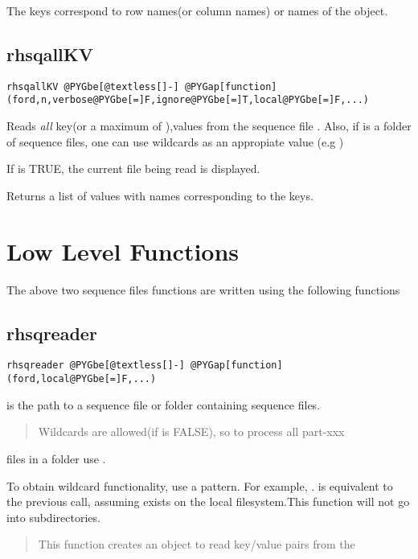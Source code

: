 \documentclass[letterpaper,10pt,english]{manual}
\begin{document}
The keys correspond to row names(or column names) or names of the object.


\subsection{rhsqallKV}

\begin{Verbatim}[commandchars=@\[\]]
rhsqallKV @PYGbe[@textless[]-] @PYGap[function](ford,n,verbose@PYGbe[=]F,ignore@PYGbe[=]T,local@PYGbe[=]F,...)
\end{Verbatim}

Reads \emph{all} key(or a maximum of ),values from the sequence file
. Also, if  is a folder of sequence files, one
can use wildcards as an appropiate value (e.g )

If  is TRUE, the current file being read is displayed.

Returns a list of values with names corresponding to the keys.


\section{Low Level Functions}

The above two sequence files functions are written using the following functions


\subsection{rhsqreader}

\begin{Verbatim}[commandchars=@\[\]]
rhsqreader @PYGbe[@textless[]-] @PYGap[function](ford,local@PYGbe[=]F,...)
\end{Verbatim}

 is the path to a sequence file or folder containing sequence
files.
\begin{quote}

Wildcards are allowed(if  is FALSE), so to process all part-xxx
\end{quote}

files in a folder use .

To obtain wildcard functionality, use a pattern. For example,
. is equivalent to the previous call,
assuming  exists on the local filesystem.This function will not go into
subdirectories.
\begin{quote}

This function creates an object to read key/value pairs from the
\end{quote}
\end{document}

